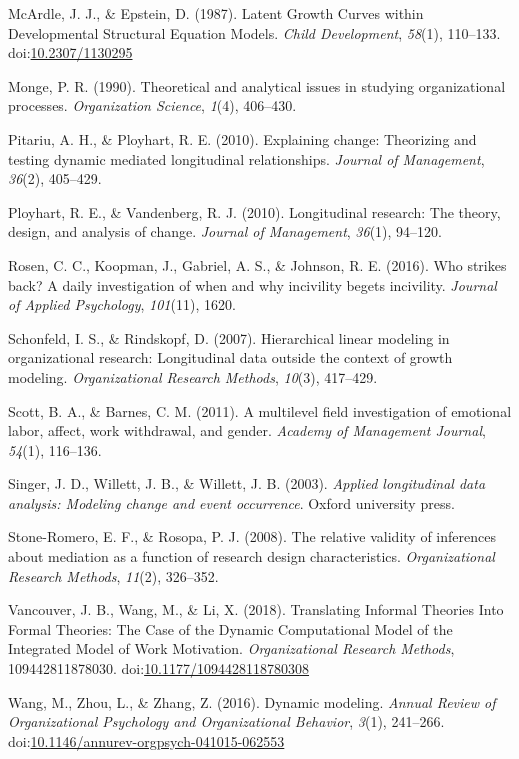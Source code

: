 \documentclass[english,,man]{apa6}
\theoremstyle{definition}
\theoremstyle{definition}
\theoremstyle{definition}
\theoremstyle{remark}
\begin{document}
\leavevmode\hypertarget{ref-mcardle_latent_1987}{}%
McArdle, J. J., \& Epstein, D. (1987). Latent Growth Curves within
Developmental Structural Equation Models. \emph{Child Development},
\emph{58}(1), 110--133.
doi:\href{https://doi.org/10.2307/1130295}{10.2307/1130295}

\leavevmode\hypertarget{ref-monge_theoretical_1990}{}%
Monge, P. R. (1990). Theoretical and analytical issues in studying
organizational processes. \emph{Organization Science}, \emph{1}(4),
406--430.

\leavevmode\hypertarget{ref-pitariu_explaining_2010}{}%
Pitariu, A. H., \& Ployhart, R. E. (2010). Explaining change: Theorizing
and testing dynamic mediated longitudinal relationships. \emph{Journal
of Management}, \emph{36}(2), 405--429.

\leavevmode\hypertarget{ref-ployhart_longitudinal_2010}{}%
Ployhart, R. E., \& Vandenberg, R. J. (2010). Longitudinal research: The
theory, design, and analysis of change. \emph{Journal of Management},
\emph{36}(1), 94--120.

\leavevmode\hypertarget{ref-rosen_who_2016}{}%
Rosen, C. C., Koopman, J., Gabriel, A. S., \& Johnson, R. E. (2016). Who
strikes back? A daily investigation of when and why incivility begets
incivility. \emph{Journal of Applied Psychology}, \emph{101}(11), 1620.

\leavevmode\hypertarget{ref-schonfeld2007hierarchical}{}%
Schonfeld, I. S., \& Rindskopf, D. (2007). Hierarchical linear modeling
in organizational research: Longitudinal data outside the context of
growth modeling. \emph{Organizational Research Methods}, \emph{10}(3),
417--429.

\leavevmode\hypertarget{ref-scott_multilevel_2011}{}%
Scott, B. A., \& Barnes, C. M. (2011). A multilevel field investigation
of emotional labor, affect, work withdrawal, and gender. \emph{Academy
of Management Journal}, \emph{54}(1), 116--136.

\leavevmode\hypertarget{ref-singer_applied_2003}{}%
Singer, J. D., Willett, J. B., \& Willett, J. B. (2003). \emph{Applied
longitudinal data analysis: Modeling change and event occurrence}.
Oxford university press.

\leavevmode\hypertarget{ref-stone2008relative}{}%
Stone-Romero, E. F., \& Rosopa, P. J. (2008). The relative validity of
inferences about mediation as a function of research design
characteristics. \emph{Organizational Research Methods}, \emph{11}(2),
326--352.

\leavevmode\hypertarget{ref-vancouver_translating_2018}{}%
Vancouver, J. B., Wang, M., \& Li, X. (2018). Translating Informal
Theories Into Formal Theories: The Case of the Dynamic Computational
Model of the Integrated Model of Work Motivation. \emph{Organizational
Research Methods}, 109442811878030.
doi:\href{https://doi.org/10.1177/1094428118780308}{10.1177/1094428118780308}

\leavevmode\hypertarget{ref-Wang2016}{}%
Wang, M., Zhou, L., \& Zhang, Z. (2016). Dynamic modeling. \emph{Annual
Review of Organizational Psychology and Organizational Behavior},
\emph{3}(1), 241--266.
doi:\href{https://doi.org/10.1146/annurev-orgpsych-041015-062553}{10.1146/annurev-orgpsych-041015-062553}
\end{document}
